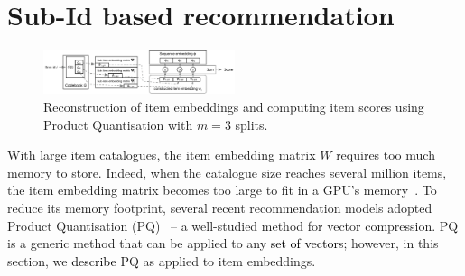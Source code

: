 \documentclass[sigconf,natbib=true, review=true]{acmart} %
\newcommand{\pageenlarge}[1]{\marginnote{#1}\enlargethispage{#1\baselineskip}}
\newcommand{\sasha}[1]{\textcolor[HTML]{000000}{#1}}
\newcommand{\nt}[1]{\textcolor{black}{#1}}
\begin{document}
\section{Sub-Id based recommendation}\label{ssec:recjpq}


\begin{figure}[tb]\hspace{-3mm}
    \vspace{-0.5\baselineskip}
\includegraphics[width=0.5\textwidth]{figures/pq_scoring_graffle.pdf}%
    \caption{Reconstruction of item embeddings \sasha{and computing item scores} using Product Quantisation \sasha{with $m=3$ splits.} }\vspace{-.75\baselineskip}
    \label{fig:embedding_reconstruction}
\end{figure}

\pageenlarge{3}
With large item catalogues, the item embedding matrix $W$ requires too much memory to store. Indeed, when the catalogue size reaches several million items, the item embedding matrix becomes too large to fit in a GPU's memory~\cite{petrovRecJPQTrainingLargeCatalogue2024}. To reduce its memory footprint, several recent recommendation models adopted Product Quantisation (PQ)~\cite{jegouProductQuantizationNearest2011} -- a well-studied method for vector compression. PQ is a generic method that can be applied to any \nt{set of vectors}; however, in this section, we \nt{describe} PQ as applied to item embeddings. 
\end{document}

